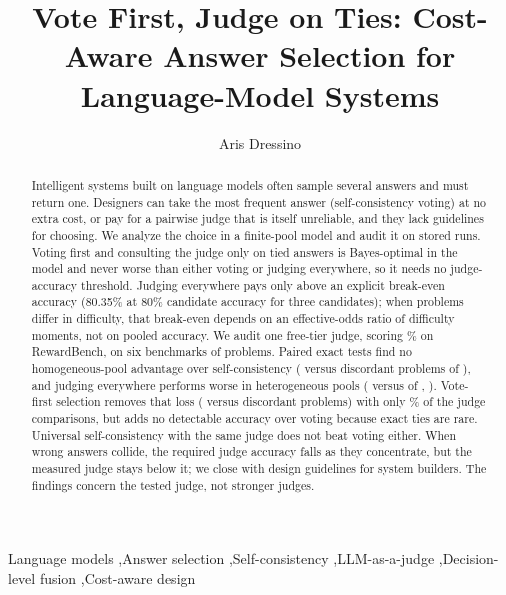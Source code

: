\documentclass[preprint,11pt,number,sort&compress]{elsarticle}
\begin{document}
\begin{frontmatter}

\title{Vote First, Judge on Ties: Cost-Aware Answer Selection for Language-Model Systems}

\author[inst1]{Aris Dressino}

\begin{abstract}
Intelligent systems built on language models often sample several answers and must return one. Designers can take the most frequent answer (self-consistency voting) at no extra cost, or pay for a pairwise judge that is itself unreliable, and they lack guidelines for choosing. We analyze the choice in a finite-pool model and audit it on stored runs. Voting first and consulting the judge only on tied answers is Bayes-optimal in the model and never worse than either voting or judging everywhere, so it needs no judge-accuracy threshold. Judging everywhere pays only above an explicit break-even accuracy (80.35\% at 80\% candidate accuracy for three candidates); when problems differ in difficulty, that break-even depends on an effective-odds ratio of difficulty moments, not on pooled accuracy. We audit one free-tier judge, scoring \RBOverallAcc\% on RewardBench, on six benchmarks of \TotalProblems{} problems. Paired exact tests find no homogeneous-pool advantage over self-consistency (\HomogPooledB{} versus \HomogPooledC{} discordant problems of \HomogPooledN{}), and judging everywhere performs worse in heterogeneous pools (\HeteroPooledB{} versus \HeteroPooledC{} of \HeteroPooledN{}, \HeteroPooledP). Vote-first selection removes that loss (\HybHetBCop{} versus \HybHetCCop{} discordant problems) with only \HybHetCallShare\% of the judge comparisons, but adds no detectable accuracy over voting because exact ties are rare. Universal self-consistency with the same judge does not beat voting either. When wrong answers collide, the required judge accuracy falls as they concentrate, but the measured judge stays below it; we close with design guidelines for system builders. The findings concern the tested judge, not stronger judges.
\end{abstract}

\begin{keyword}
Language models \sep Answer selection \sep Self-consistency \sep LLM-as-a-judge \sep Decision-level fusion \sep Cost-aware design
\end{keyword}

\end{frontmatter}
\end{document}
